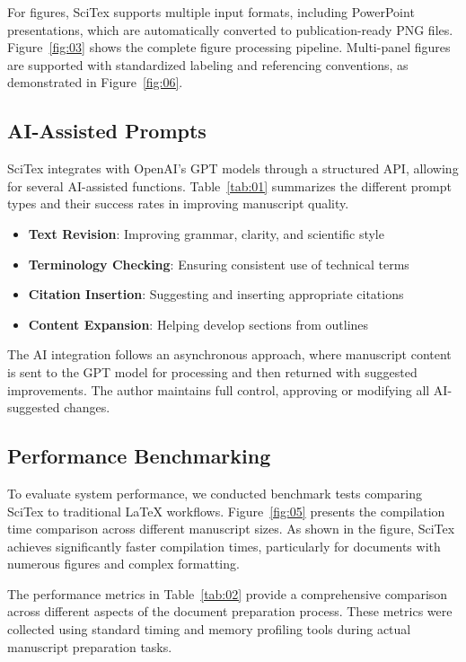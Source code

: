 For figures, SciTex supports multiple input formats, including PowerPoint presentations, which are automatically converted to publication-ready PNG files. Figure~\ref{fig:03} shows the complete figure processing pipeline. Multi-panel figures are supported with standardized labeling and referencing conventions, as demonstrated in Figure~\ref{fig:06}.

\subsection{AI-Assisted Prompts}
\label{sec:ai_integration}

SciTex integrates with OpenAI's GPT models through a structured API, allowing for several AI-assisted functions. Table~\ref{tab:01} summarizes the different prompt types and their success rates in improving manuscript quality.

\begin{itemize}
    \item \textbf{Text Revision}: Improving grammar, clarity, and scientific style
    \item \textbf{Terminology Checking}: Ensuring consistent use of technical terms
    \item \textbf{Citation Insertion}: Suggesting and inserting appropriate citations
    \item \textbf{Content Expansion}: Helping develop sections from outlines
\end{itemize}

The AI integration follows an asynchronous approach, where manuscript content is sent to the GPT model for processing and then returned with suggested improvements. The author maintains full control, approving or modifying all AI-suggested changes.

\subsection{Performance Benchmarking}

To evaluate system performance, we conducted benchmark tests comparing SciTex to traditional LaTeX workflows. Figure~\ref{fig:05} presents the compilation time comparison across different manuscript sizes. As shown in the figure, SciTex achieves significantly faster compilation times, particularly for documents with numerous figures and complex formatting.

The performance metrics in Table~\ref{tab:02} provide a comprehensive comparison across different aspects of the document preparation process. These metrics were collected using standard timing and memory profiling tools during actual manuscript preparation tasks.

